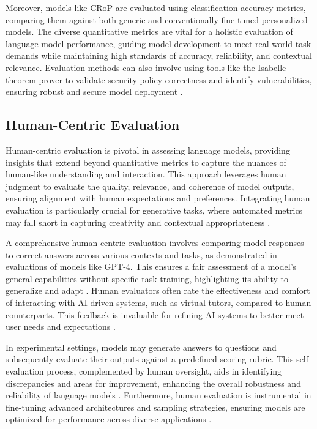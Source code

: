 Moreover, models like CRoP are evaluated using classification accuracy metrics, comparing them against both generic and conventionally fine-tuned personalized models. The diverse quantitative metrics are vital for a holistic evaluation of language model performance, guiding model development to meet real-world task demands while maintaining high standards of accuracy, reliability, and contextual relevance. Evaluation methods can also involve using tools like the Isabelle theorem prover to validate security policy correctness and identify vulnerabilities, ensuring robust and secure model deployment \cite{kammller2020applyingisabelleinsiderframework}.


\subsection{Human-Centric Evaluation} \label{subsec:Human-Centric Evaluation}

Human-centric evaluation is pivotal in assessing language models, providing insights that extend beyond quantitative metrics to capture the nuances of human-like understanding and interaction. This approach leverages human judgment to evaluate the quality, relevance, and coherence of model outputs, ensuring alignment with human expectations and preferences. Integrating human evaluation is particularly crucial for generative tasks, where automated metrics may fall short in capturing creativity and contextual appropriateness \cite{li2023ecomgptinstructiontuninglargelanguage}.

A comprehensive human-centric evaluation involves comparing model responses to correct answers across various contexts and tasks, as demonstrated in evaluations of models like GPT-4. This ensures a fair assessment of a model's general capabilities without specific task training, highlighting its ability to generalize and adapt \cite{GPT-4Techn0}. Human evaluators often rate the effectiveness and comfort of interacting with AI-driven systems, such as virtual tutors, compared to human counterparts. This feedback is invaluable for refining AI systems to better meet user needs and expectations \cite{bassner2024irisaidrivenvirtualtutor}.

In experimental settings, models may generate answers to questions and subsequently evaluate their outputs against a predefined scoring rubric. This self-evaluation process, complemented by human oversight, aids in identifying discrepancies and areas for improvement, enhancing the overall robustness and reliability of language models \cite{oh2024generativeaiparadoxevaluation}. Furthermore, human evaluation is instrumental in fine-tuning advanced architectures and sampling strategies, ensuring models are optimized for performance across diverse applications \cite{dhariwal2021diffusion}.

